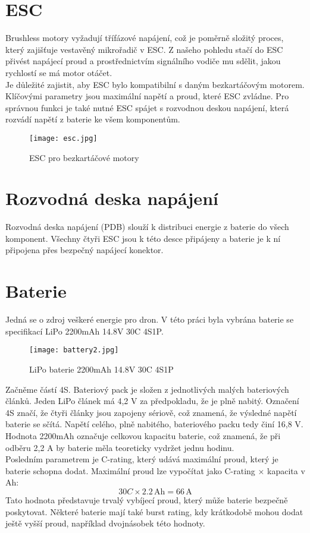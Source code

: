 \documentclass[12pt]{report}
\begin{document}
\section[ESC]{ESC}
Brushless motory vyžadují třífázové napájení, což je poměrně složitý proces, který zajišťuje vestavěný mikrořadič v ESC. Z našeho pohledu stačí do ESC přivést napájecí proud a prostřednictvím signálního vodiče mu sdělit, jakou rychlostí se má motor otáčet.\\
Je důležité zajistit, aby ESC bylo kompatibilní s daným bezkartáčovým motorem. Klíčovými parametry jsou maximální napětí a proud, které ESC zvládne. Pro správnou funkci je také nutné ESC spájet s rozvodnou deskou napájení, která rozvádí napětí z baterie ke všem komponentům.
\begin{figure}[H]
	\centering
	\texttt{[image: esc.jpg]}
	\caption{ESC pro bezkartáčové motory}
	\label{fig:esc.jpg}
\end{figure}

\section{Rozvodná deska napájení}
Rozvodná deska napájení (PDB) slouží k distribuci energie z baterie do všech komponent. Všechny čtyři ESC jsou k této desce připájeny a baterie je k ní připojena přes bezpečný napájecí konektor.

\section[Baterie]{Baterie}
Jedná se o zdroj veškeré energie pro dron. V této práci byla vybrána baterie se specifikací LiPo 2200mAh 14.8V 30C 4S1P.
\begin{figure}[H]
	\centering
	\texttt{[image: battery2.jpg]}
	\caption{LiPo baterie 2200mAh 14.8V 30C 4S1P}
	\label{fig:battery2.jpg}
\end{figure}
Začněme částí 4S. Bateriový pack je složen z jednotlivých malých bateriových článků. Jeden LiPo článek má 4,2 V za předpokladu, že je plně nabitý. Označení 4S značí, že čtyři články jsou zapojeny sériově, což znamená, že výsledné napětí baterie se sčítá. Napětí celého, plně nabitého, bateriového packu tedy činí 16,8 V.\\
Hodnota 2200mAh označuje celkovou kapacitu baterie, což znamená, že při odběru 2,2 A by baterie měla teoreticky vydržet jednu hodinu.\\
Posledním parametrem je C-rating, který udává maximální proud, který je baterie schopna dodat. Maximální proud lze vypočítat jako C-rating × kapacita v Ah:
\[
30C \times 2.2\,\text{Ah} = 66\,\text{A}
\]
Tato hodnota představuje trvalý vybíjecí proud, který může baterie bezpečně poskytovat. Některé baterie mají také burst rating, kdy krátkodobě mohou dodat ještě vyšší proud, například dvojnásobek této hodnoty.
\end{document}
